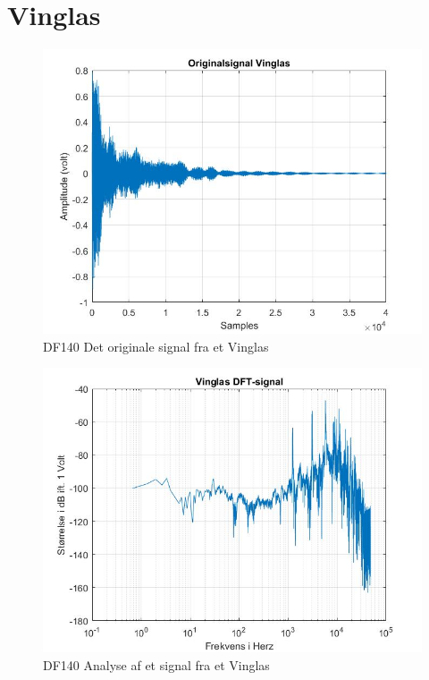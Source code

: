 \section{Vinglas}
\begin{figure}[H]
	\centering
	\includegraphics[width=140mm]{figures/Vinglas/original.jpg}
	\caption{DF140 Det originale signal fra et Vinglas}
	\label{fig:Vinglas original}
\end{figure}

\begin{figure}[H]
	\centering
	\includegraphics[width=140mm]{figures/Vinglas/DFT.jpg}
	\caption{DF140 Analyse af et signal fra et Vinglas}
	\label{fig:Vinglas DF140}
\end{figure}

